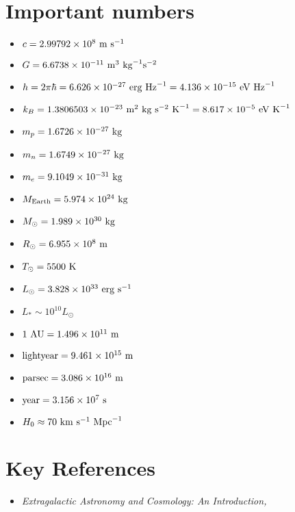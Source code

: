 \section{Important numbers}

\begin{itemize}
\item $c = 2.99792 \times 10^8  {\rm ~m} {\rm ~s}^{-1} $
\item $G = 6.6738 \times 10^{-11} {\rm ~m}^3 {\rm ~kg}^{-1} {\rm s}^{-2} $
\item $h = 2\pi \hbar = 6.626 \times 10^{-27} {\rm ~erg} {\rm ~Hz}^{-1} =
4.136 \times 10^{-15} {\rm ~eV} {\rm ~Hz}^{-1}$
\item $k_B = 1.3806503 \times 10^{-23} {\rm ~m}^2 {\rm ~kg} {\rm
~s}^{-2} {\rm ~K}^{-1} = 8.617 \times 10^{-5} {\rm ~eV} {\rm ~K}^{-1}$
\item $m_p =  1.6726 \times 10^{-27} {\rm ~kg} $
\item $m_n =  1.6749 \times 10^{-27} {\rm ~kg} $
\item $m_e =  9.1049 \times 10^{-31} {\rm ~kg} $
\item $M_{\rm Earth} = 5.974 \times 10^{24} {\rm ~kg} $
\item $M_{\odot} = 1.989 \times 10^{30} {\rm ~kg} $
\item $R_{\odot} = 6.955 \times 10^{8} {\rm ~m} $
\item $T_{\odot} = 5500 {\rm ~K} $
\item $L_{\odot} = 3.828 \times 10^{33} {\rm ~erg} {\rm ~s}^{-1}$
\item $L_{\ast} \sim 10^{10} L_{\odot} $
\item ${\rm 1~AU} = 1.496 \times 10^{11} {\rm ~m} $
\item ${\rm lightyear} = 9.461 \times 10^{15} {\rm ~m} $
\item ${\rm parsec} = 3.086 \times 10^{16} {\rm ~m} $
\item ${\rm year} = 3.156 \times 10^{7} {\rm ~s} $
\item $H_0 \approx 70 {\rm ~km} {\rm ~s}^{-1} {\rm ~Mpc}^{-1}$     
\end{itemize}

\section{Key References}

\begin{itemize}
  \item {\it Extragalactic Astronomy and Cosmology: An Introduction,
    \citet{schneider15a}}
\end{itemize}

